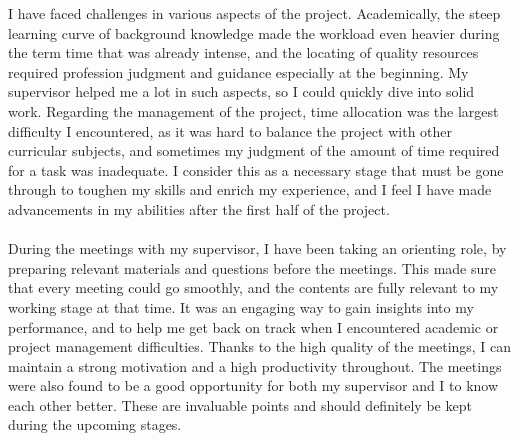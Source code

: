 I have faced challenges in various aspects of the project. Academically, the steep learning curve of background knowledge made the workload even heavier during the term time that was already intense, and the locating of quality resources required profession judgment and guidance especially at the beginning. My supervisor helped me a lot in such aspects, so I could quickly dive into solid work. Regarding the management of the project, time allocation was the largest difficulty I encountered, as it was hard to balance the project with other curricular subjects, and sometimes my judgment of the amount of time required for a task was inadequate. I consider this as a necessary stage that must be gone through to toughen my skills and enrich my experience, and I feel I have made advancements in my abilities after the first half of the project.
\\\\
During the meetings with my supervisor, I have been taking an orienting role, by preparing relevant materials and questions before the meetings. This made sure that every meeting could go smoothly, and the contents are fully relevant to my working stage at that time. It was an engaging way to gain insights into my performance, and to help me get back on track when I encountered academic or project management difficulties. Thanks to the high quality of the meetings, I can maintain a strong motivation and a high productivity throughout. The meetings were also found to be a good opportunity for both my supervisor and I to know each other better. These are invaluable points and should definitely be kept during the upcoming stages.
